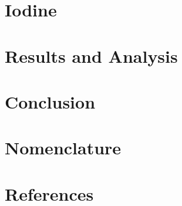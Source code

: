 \documentclass[letterpaper,12pt]{article}
\begin{document}
\section{Iodine}




\section{Results and Analysis}




\section{Conclusion}




\section{Nomenclature}



\section{References}
\end{document}
